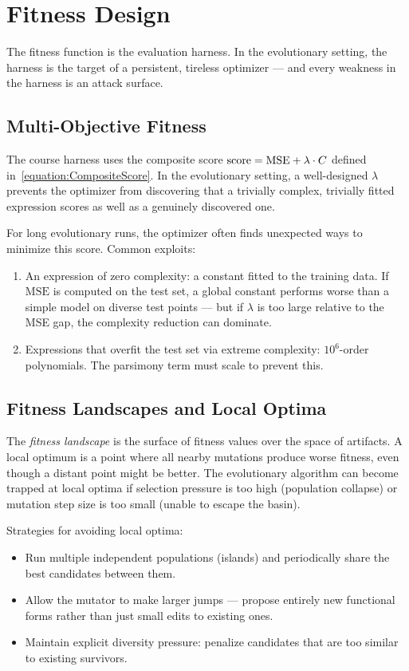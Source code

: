 \section{Fitness Design}
\label{section:FitnessDesign}

The fitness function is the evaluation harness.
In the evolutionary setting, the harness is the target of a persistent, tireless optimizer — and every weakness in the harness is an attack surface.

\subsection{Multi-Objective Fitness}

The course harness uses the composite score $\mathrm{score} = \mathrm{MSE} + \lambda \cdot C$ defined in~\eqref{equation:CompositeScore}.
In the evolutionary setting, a well-designed $\lambda$ prevents the optimizer from discovering that a trivially complex, trivially fitted expression scores as well as a genuinely discovered one.

For long evolutionary runs, the optimizer often finds unexpected ways to minimize this score.
Common exploits:
\begin{enumerate}
\item An expression of zero complexity: a constant fitted to the training data.
If $\mathrm{MSE}$ is computed on the test set, a global constant performs worse than a simple model on diverse test points — but if $\lambda$ is too large relative to the MSE gap, the complexity reduction can dominate.
\item Expressions that overfit the test set via extreme complexity: $10^6$-order polynomials.
The parsimony term must scale to prevent this.
\end{enumerate}

\subsection{Fitness Landscapes and Local Optima}

The \emph{fitness landscape} is the surface of fitness values over the space of artifacts.
A local optimum is a point where all nearby mutations produce worse fitness, even though a distant point might be better.
The evolutionary algorithm can become trapped at local optima if selection pressure is too high (population collapse) or mutation step size is too small (unable to escape the basin).

Strategies for avoiding local optima:
\begin{itemize}
\item Run multiple independent populations (islands) and periodically share the best candidates between them.
\item Allow the mutator to make larger jumps — propose entirely new functional forms rather than just small edits to existing ones.
\item Maintain explicit diversity pressure: penalize candidates that are too similar to existing survivors.
\end{itemize}


